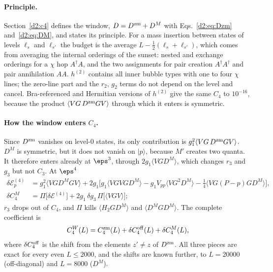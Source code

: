 \paragraph{Principle.} Section~\ref{d2:c4} defines the window, $D=D^{\rm zm}+D^M$ with Eqs.~\eqref{d2:eq:Dzm}
and~\eqref{d2:eq:DM}, and states its principle. For a mass insertion between states of levels $\ell_s$ and $\ell_{s'}$ the
budget is the average $L-\frac12(\ell_s+\ell_{s'})$, which comes from averaging the internal orderings of the sunset: nested
and exchange orderings for a $\chi$ hop $A^\dagger A$, and the two assignments for pair creation $A^\dagger A^\dagger$ and pair
annihilation $AA$. $h^{(2)}$ contains all inner bubble types with one to four $\chi$ lines; the zero-line part and the $r_2$,
$g_2$ terms do not depend on the level and cancel. Bra-referenced and Hermitian versions of $h^{(2)}$ give the same $C_4$ to
$10^{-16}$, because the product $\langle VG\,D^{\rm zm}GV\rangle$ through which it enters is symmetric.

\paragraph{How the window enters $C_4$.} Since $D^{\rm zm}$ vanishes on level-0 states, its only contribution is
$g_1^2\langle VG\,D^{\rm zm}GV\rangle$. $D^M$ is symmetric, but it does not vanish on $|p\rangle$, because $M'$ creates two
quanta. It therefore enters already at $\eps^3$, through $2g_1\langle VGD^M\rangle$, which changes $r_3$ and $g_3$ but not $C_3$.
At $\eps^4$
\begin{align}
 \delta\mathcal E^{(4)}_p&=g_1^2\langle VGD^MGV\rangle+2g_1\big[g_1\langle VGVGD^M\rangle-g_1V_{pp}\langle VG^2D^M\rangle
 -\tfrac14\langle VG(P-p)GD^M\rangle\big],\nonumber\\
 \delta C_4^M&=\Pi\big[\delta\mathcal E^{(4)}\big]+2g_1\,\delta g_3\,\Pi\big[\langle VGV\rangle\big] ;
\end{align}
$r_3$ drops out of $C_4$, and $\Pi$ kills $\langle H_2GD^M\rangle$ and $\langle D^MGD^M\rangle$. The complete coefficient is
\begin{equation}
 C_4^W(L)=C_4^{\rm zm}(L)+\delta C_4^{\rm off}(L)+\delta C_4^M(L),
\end{equation}
where $\delta C_4^{\rm off}$ is the shift from the elements $z'\neq z$ of $D^{\rm zm}$. All three pieces are exact for every
even $L\le2000$, and the shifts are known further, to $L=20000$ (off-diagonal) and $L=8000$ ($D^M$).


